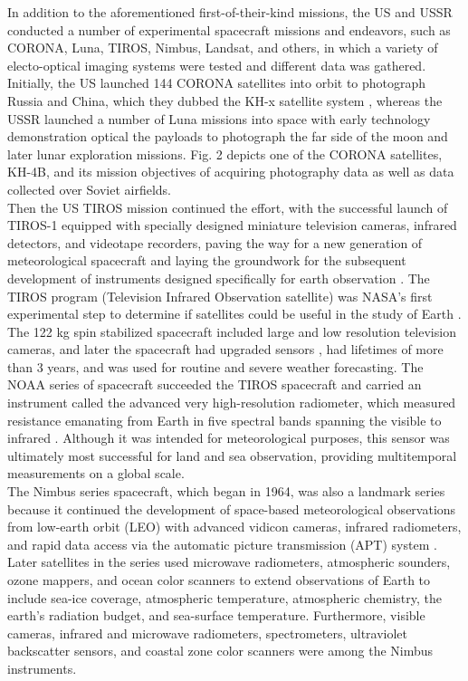 \documentclass[final,5p,times,twocolumn]{elsarticle}
\begin{document}
In addition to the aforementioned first-of-their-kind missions, the US and USSR conducted a number of experimental spacecraft missions and endeavors, such as CORONA, Luna, TIROS, Nimbus, Landsat, and others, in which a variety of electo-optical imaging systems were tested and different data was gathered. Initially, the US launched 144 CORONA satellites into orbit to photograph Russia and China, which they dubbed the KH-x satellite system \citep{ruffner1995corona}, whereas the USSR launched a number of Luna missions into space with early technology demonstration optical the payloads to photograph the far side of the moon and later lunar exploration missions. Fig. 2 depicts one of the CORONA satellites, KH-4B, and its mission objectives of acquiring photography data as well as data collected over Soviet airfields.\\
Then the US TIROS mission continued the effort, with the successful launch of TIROS-1 equipped with specially designed miniature television cameras, infrared detectors, and videotape recorders, paving the way for a new generation of meteorological spacecraft and laying the groundwork for the subsequent development of instruments designed specifically for earth observation \citep{Tatem2008FiftyYO}. The TIROS program (Television Infrared Observation satellite) was NASA's first experimental step to determine if satellites could be useful in the study of Earth \citep{neeck2005nasa}. The 122 kg spin stabilized spacecraft included large and low resolution television cameras, and later the spacecraft had upgraded sensors \citep{neeck2005nasa}, had lifetimes of more than 3 years, and was used for routine and severe weather forecasting. The NOAA series of spacecraft succeeded the TIROS spacecraft and carried an instrument called the advanced very high-resolution radiometer, which measured resistance emanating from Earth in five spectral bands spanning the visible to infrared \citep{Tatem2008FiftyYO}. Although it was intended for meteorological purposes, this sensor was ultimately most successful for land and sea observation, providing multitemporal measurements on a global scale.\\ 
The Nimbus series spacecraft, which began in 1964, was also a landmark series because it continued the development of space-based meteorological observations from low-earth orbit (LEO) with advanced vidicon cameras, infrared radiometers, and rapid data access via the automatic picture transmission (APT) system \citep{neeck2005nasa, Tatem2008FiftyYO}. Later satellites in the series used microwave radiometers, atmospheric sounders, ozone mappers, and ocean color scanners to extend observations of Earth to include sea-ice coverage, atmospheric temperature, atmospheric chemistry, the earth's radiation budget, and sea-surface temperature. Furthermore, visible cameras, infrared and microwave radiometers, spectrometers, ultraviolet backscatter sensors, and coastal zone color scanners were among the Nimbus instruments.\\
\end{document}
